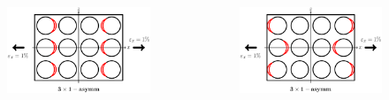 \documentclass[first,firstsupp,lastsupp,last,hyperref,table]{ETHclass}
\begin{document}
\begin{frame}
\begin{columns}[c]
\begin{column}{0.5\textwidth}
\begin{figure}
\end{figure}
\end{column}
\end{columns}
\vspace{-0.35cm}
\begin{columns}[c]
\centering
\begin{column}{0.5\textwidth}
\centering
\begin{figure}
\centering
\includegraphics[width=0.75\columnwidth]{twofibers-sameside-strainmagni3.pdf}
\end{figure}
\end{column}
\begin{column}{0.5\textwidth}
\centering
\begin{figure}
\centering
\includegraphics[width=0.75\columnwidth]{twofibers-oppositeside-strainmagni3.pdf}
\end{figure}
\end{column}
\end{columns}
\end{frame}

\addtocounter{framenumber}{-1}
\end{document}
